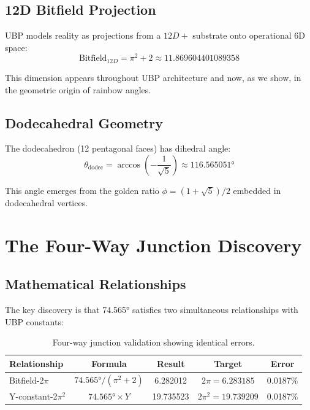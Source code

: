 \documentclass[11pt,a4paper]{article}
\begin{document}
\subsection{12D Bitfield Projection}

UBP models reality as projections from a $12D+$ substrate onto operational 6D space\cite{ubp_bitfield}:
\begin{equation}
\text{Bitfield}_{12D} = \pi^2 + 2 \approx 11.869604401089358
\end{equation}

This dimension appears throughout UBP architecture and now, as we show, in the geometric origin of rainbow angles.

\subsection{Dodecahedral Geometry}

The dodecahedron (12 pentagonal faces) has dihedral angle\cite{platonic_solids}:
\begin{equation}
\theta_{\text{dodec}} = \arccos\left(-\frac{1}{\sqrt{5}}\right) \approx 116.565051°
\end{equation}

This angle emerges from the golden ratio $\phi = (1+\sqrt{5})/2$ embedded in dodecahedral vertices.

\section{The Four-Way Junction Discovery}

\subsection{Mathematical Relationships}

The key discovery is that 74.565° satisfies two simultaneous relationships with UBP constants:

\begin{table}[H]
\centering
\begin{tabular}{lcccc}
\toprule
\textbf{Relationship} & \textbf{Formula} & \textbf{Result} & \textbf{Target} & \textbf{Error} \\
\midrule
Bitfield-2$\pi$ & $74.565° / (\pi^2+2)$ & 6.282012 & $2\pi = 6.283185$ & 0.0187\% \\
Y-constant-2$\pi^2$ & $74.565° \times Y$ & 19.735523 & $2\pi^2 = 19.739209$ & 0.0187\% \\
\bottomrule
\end{tabular}
\caption{Four-way junction validation showing identical errors.}
\end{table}
\end{document}
